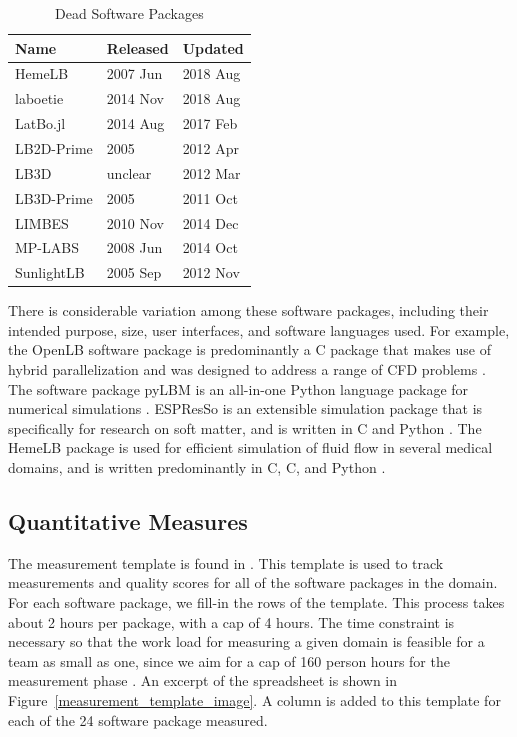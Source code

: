 \documentclass[final, 3p, times, authoryear]{elsarticle}
\newcommand{\CC}{C\nolinebreak\hspace{-.05em}\raisebox{.4ex}{\small\bf
+}\nolinebreak\hspace{-.10em}\raisebox{.4ex}{\small\bf +}}
\begin{document}
\begin{table}
\begin{center}
	\begin{tabular}{ p{4cm}p{3cm}p{3cm} }
		\hline
		Name & Released & Updated\\
		\hline
		HemeLB & 2007 Jun & 2018 Aug\\
		laboetie & 2014 Nov & 2018 Aug\\		
		LatBo.jl & 2014 Aug & 2017 Feb\\
		LB2D-Prime & 2005 & 2012 Apr\\
		LB3D & unclear & 2012 Mar\\
		LB3D-Prime & 2005 & 2011 Oct\\
		LIMBES & 2010 Nov & 2014 Dec\\
		MP-LABS & 2008 Jun & 2014 Oct\\
		SunlightLB & 2005 Sep & 2012 Nov\\
		\hline
	\end{tabular}
	\caption{Dead Software Packages} \label{deadpackages}
\end{center}
\end{table}

There is considerable variation among these software packages, including their
intended purpose, size, user interfaces, and software languages used. For
example, the OpenLB software package is predominantly a \CC{} package that makes
use of hybrid parallelization and was designed to address a range of CFD
problems \citep{heuveline2009towards}. The software package pyLBM is an
all-in-one Python language package for numerical simulations
\citep{graille2017pylbm}. ESPResSo is an extensible simulation package that is
specifically for research on soft matter, and is written in \CC{} and Python
\citep{weik2019espresso}. The HemeLB package is used for efficient simulation of
fluid flow in several medical domains, and is written predominantly in C, \CC,
and Python \citep{mazzeo2008hemelb}.

\subsection{Quantitative Measures} \label{empiricalmeasures}

The measurement template is found in \citet{SmithEtAl2021}.  This template is
used to track measurements and quality scores for all of the software packages
in the domain. For each software package, we fill-in the rows of the template.
This process takes about 2 hours per package, with a cap of 4 hours.  The time
constraint is necessary so that the work load for measuring a given domain is
feasible for a team as small as one, since we aim for a cap of 160 person hours
for the measurement phase \citet{SmithEtAl2021}.  An excerpt of the spreadsheet
is shown in Figure~\ref{measurement_template_image}.  A column is added to this
template for each of the 24 software package measured.
\end{document}
